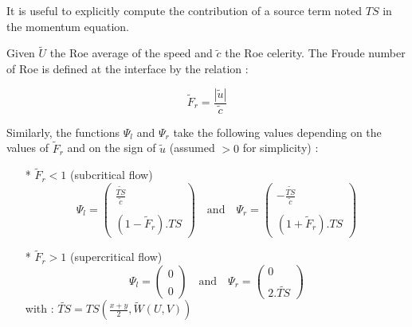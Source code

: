\vspace{0.5cm}

It is useful to explicitly compute the contribution of a source term noted $TS$ in the momentum equation.

\vspace{0.5cm}

Given $\tilde{U}$ the Roe average of the speed and $\tilde{c}$ the Roe celerity. The Froude number of Roe is defined at the interface by the relation :

\begin{equation}
 \tilde{F}_r = \frac{|\tilde{u}|}{\tilde{c}}
\end{equation}

\vspace{0.5cm}

Similarly, the functions $\Psi_l$ and $\Psi_r$ take the following values depending on the values of $\tilde{F}_r$ and on the sign of $\tilde{u}$ (assumed $>0$ for simplicity) :

\begin{itemize}
 \item[*] $\tilde{F}_r<1$ \quad (subcritical flow)
  \begin{equation}
    \Psi_l = \left(
            \begin{array}{c}
               \frac{\tilde{TS}}{\tilde{c}}\\
               \\
               (1-\tilde{F}_r).TS
            \end{array}
          \right)
     \quad \mbox{and}\quad \Psi_r = \left(
            \begin{array}{c}
               -\frac{\tilde{TS}}{\tilde{c}}\\
               \\
               (1+\tilde{F}_r).TS
            \end{array}
          \right)
  \end{equation}
 \item[*] $\tilde{F}_r>1$ \quad (supercritical flow)
   \begin{equation}
      \Psi_l = \left(
            \begin{array}{c}
               0\\
               \\
               0
            \end{array}
          \right)
     \quad \mbox{and}\quad \Psi_r = \left(
            \begin{array}{c}
              0\\
               \\
               2.\tilde{TS}
            \end{array}
          \right)
   \end{equation}
   with : $\tilde{TS} = TS(\frac{x+y}{2},\tilde{W}(U,V))$
\end{itemize}

